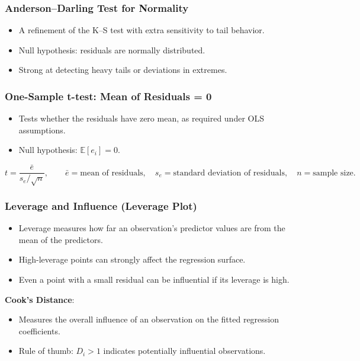 \documentclass[11pt,a4paper]{article}
\begin{document}
\subsubsection{Anderson--Darling Test for Normality}

\begin{itemize}
    \item A refinement of the K--S test with extra sensitivity to tail behavior.
    \item Null hypothesis: residuals are normally distributed.
    \item Strong at detecting heavy tails or deviations in extremes.
\end{itemize}

\subsubsection{One-Sample t-test: Mean of Residuals = 0}

\begin{itemize}
    \item Tests whether the residuals have zero mean, as required under OLS assumptions.
    \item Null hypothesis: $\mathbb{E}[e_i] = 0$.
\end{itemize}

\[
t = \frac{\bar{e}}{s_e / \sqrt{n}},
\qquad
\bar{e} = \text{mean of residuals},\quad
s_e = \text{standard deviation of residuals},\quad
n = \text{sample size}.
\]

\subsubsection{Leverage and Influence (Leverage Plot)}

\begin{itemize}
    \item Leverage measures how far an observation's predictor values are from the mean of the predictors.
    \item High-leverage points can strongly affect the regression surface.
    \item Even a point with a small residual can be influential if its leverage is high.
\end{itemize}

\textbf{Cook's Distance}:
\begin{itemize}
    \item Measures the overall influence of an observation on the fitted regression coefficients.
    \item Rule of thumb: $D_i > 1$ indicates potentially influential observations.
\end{itemize}
\end{document}

